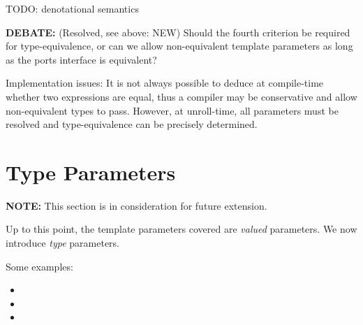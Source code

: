 TODO: denotational semantics

\begin{comment}
\textbf{OUTDATED:}
Two templated types are equivalence if and only if:
\begin{itemize}
\item They are of the same type class (channel, process,... ), obviously
\item They refer to the same base definition.  
\item The port types and dimensions are type-equivalent.  
\item Their template arguments are equal.  
\end{itemize}

The third and fourth criteria are not necessary equivalent.  
The ports of a template definition need not depend on template
parameters themselves, as is the case with defining 
cyclic source sequences for a channel.  
\end{comment}

\textbf{DEBATE:} (Resolved, see above: NEW)
Should the fourth criterion be required for type-equivalence, 
or can we allow non-equivalent template parameters as long as the
ports interface is equivalent?  

Implementation issues:
It is not always possible to deduce at compile-time whether
two expressions are equal, thus a compiler may be conservative
and allow non-equivalent types to pass.  
However, at unroll-time, all parameters must be resolved
and type-equivalence can be precisely determined.  

\section{Type Parameters}
\label{sec:templates:typeparam}

\textbf{NOTE:} This section is in consideration for future extension.  

Up to this point, the template parameters covered are 
\emph{valued} parameters.  
We now introduce \emph{type} parameters.  

Some examples:

\begin{itemize}
\item {}
\item {}
\item {}
\end{itemize}


